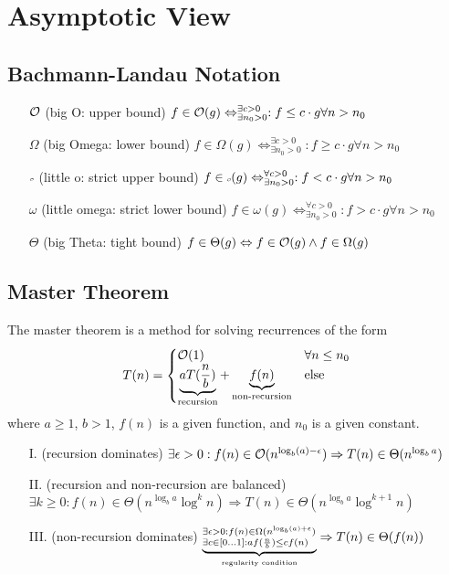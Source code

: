 \documentclass{summary}
\author{Leopold Lemmermann}
\begin{document}
\createtitle

\section{Asymptotic View}
\subsection{Bachmann-Landau Notation}
\begin{itemize}
  \item[$\mathcal{O}$] (big O: upper bound) $f\in \mathcal{O}(g) \Leftrightarrow ^{\exists c > 0}_{\exists n_0 > 0}: f \leq c \cdot g \forall n > n_0$
  \item[$\Omega$] (big Omega: lower bound) $f\in \Omega(g) \Leftrightarrow ^{\exists c > 0}_{\exists n_0 > 0}: f \geq c \cdot g \forall n > n_0$
  \item[$\littleO$] (little o: strict upper bound) $f\in \littleO(g) \Leftrightarrow ^{\forall c > 0}_{\exists n_0 > 0}: f < c \cdot g \forall n > n_0$
  \item[$\omega$] (little omega: strict lower bound) $f\in \omega(g) \Leftrightarrow ^{\forall c > 0}_{\exists n_0 > 0}: f > c \cdot g \forall n > n_0$
  \item[$\Theta$] (big Theta: tight bound) $f\in \Theta(g) \Leftrightarrow f\in \mathcal{O}(g) \land f\in \Omega(g)$
\end{itemize}

\subsection{Master Theorem}
The master theorem is a method for solving recurrences of the form
\begin{equation}
  T(n) = \begin{cases}
    \mathcal{O}(1)                                                                                   & \forall n \leq n_0 \\
    \underbrace{aT(\frac{n}{b})}_{\text{recursion}} + \underbrace{f(n)}_{\text{non-recursion}} & \text{else}
  \end{cases}
\end{equation}
where $a \geq 1$, $b > 1$, $f(n)$ is a given function, and $n_0$ is a given constant.

\begin{itemize}
  \item[I.] (recursion dominates) $\exists \epsilon > 0: f(n) \in \mathcal{O}(n^{\log_b(a)-\epsilon}) \Rightarrow T(n) \in \Theta(n^{\log_b a})$
  \item[II.] (recursion and non-recursion are balanced) $\exists k \ge 0: f(n) \in \Theta(n^{\log_b a}\log^k n) \Rightarrow T(n) \in \Theta(n^{\log_b a} \log^{k+1} n)$
  \item[III.] (non-recursion dominates) $\underbrace{^{\exists \epsilon > 0: f(n) \in \Omega(n^{\log_b(a)+\epsilon})}_{\exists c \in [0\dots1]: a f(\frac{n}{b}) \leq c f(n)}}_{\text{\tiny regularity condition}} \Rightarrow T(n) \in \Theta(f(n))$
\end{itemize}
\end{document}
